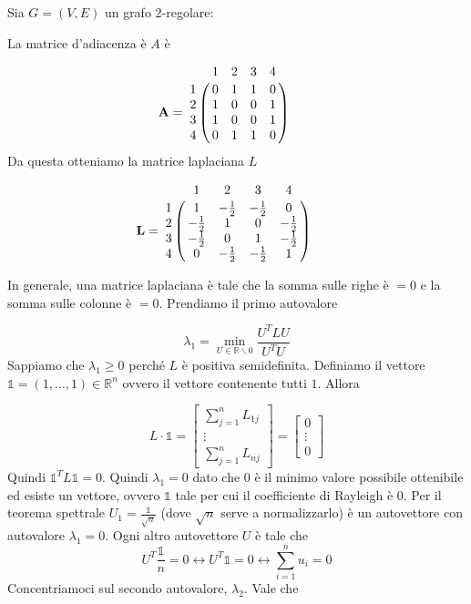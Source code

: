 \documentclass[12pt]{report}
\begin{document}
\begin{exmp}
   Sia $G=(V,E)$ un grafo $2$-regolare:

    \noindent 
    La matrice d'adiacenza è $A$ è

    \[\mathbf{A} = 
    \bordermatrix{ & 1 & 2 & 3 & 4 \cr
      1 & 0 & 1 & 1 & 0  \cr
      2 & 1 & 0 & 0 & 1  \cr
      3 & 1 & 0 & 0 & 1  \cr 
      4 & 0 & 1 & 1 & 0 } \qquad
      \]
      Da questa otteniamo la matrice laplaciana $L$

      \[\mathbf{L} = 
    \bordermatrix{ & 1 & 2 & 3 & 4 \cr
      1 & 1 & -\frac{1}{2} & -\frac{1}{2} & 0  \cr
      2 & -\frac{1}{2} & 1 & 0 & -\frac{1}{2}  \cr
      3 & -\frac{1}{2} & 0 & 1 & -\frac{1}{2}  \cr 
      4 & 0 & -\frac{1}{2} & -\frac{1}{2} & 1 } \qquad
      \]
\end{exmp}

\noindent 
In generale, una matrice laplaciana è tale che la somma sulle righe  è $= 0$ e la somma sulle colonne è $= 0$. Prendiamo il primo autovalore

$$\lambda_1 = \min_{U \in \mathbb{R} \backslash 0} \frac{U^T L U}{U^T U}$$
Sappiamo che $\lambda_1 \geq 0$ perché $L$ è positiva semidefinita. Definiamo il vettore $\mathds{1} = (1,\dots,1) \in \mathbb{R}^n$ ovvero il vettore contenente tutti $1$. Allora 

\[
L \cdot \mathds{1} = \begin{bmatrix}
        \sum_{j = 1}^n L_{1j}\\ 
        \vdots \\
        \sum_{j = 1}^n L_{nj}
\end{bmatrix} = \begin{bmatrix}
        0\\ 
        \vdots \\
        0
        \end{bmatrix}
\]
Quindi $\mathds{1}^T L \mathds{1} = 0$. Quindi $\lambda_1 = 0$ dato che $0$ è il minimo valore possibile ottenibile ed esiste un vettore, ovvero $\mathds{1}$ tale per cui il coefficiente di Rayleigh è $0$. Per il teorema spettrale $U_1 = \frac{\mathds{1}}{\sqrt{n}}$ (dove $\sqrt{n}$ serve a normalizzarlo) è un autovettore con autovalore $\lambda_1 = 0$. 
Ogni altro autovettore $U$ è tale che $$U^T \frac{\mathds{1}}{n} = 0 \leftrightarrow U^T \mathds{1} = 0 \leftrightarrow \sum_{i = 1}^n u_i = 0$$
Concentriamoci sul secondo autovalore, $\lambda_2$. Vale che 
\end{document}
